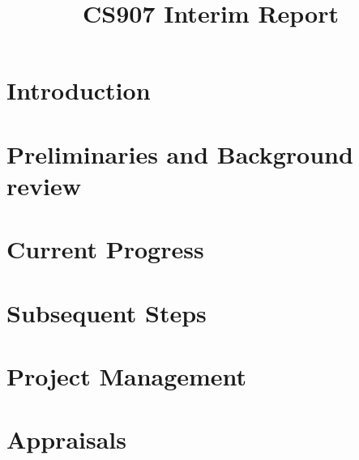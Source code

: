 \documentclass[onecolumn]{IEEEtran}
\begin{document}
\title{CS907 Interim Report}

\author{
}

\maketitle

\begin{abstract}

\end{abstract}

\section{Introduction}


\section{Preliminaries and Background review}


\section{Current Progress}


\section{Subsequent Steps}



\section{Project Management} 



\section{Appraisals}





% 
\end{document}
